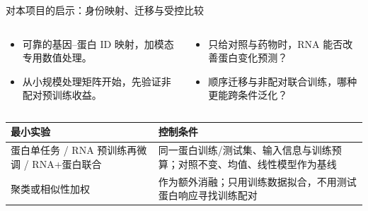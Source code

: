 \begin{frame}[t]{对本项目的启示：身份映射、迁移与受控比较}
\bodyfont
\begin{columns}[T,onlytextwidth]
\begin{column}{.47\textwidth}
\begin{itemize}\setlength\itemsep{.14cm}
\item 可靠的基因--蛋白 ID 映射，加模态专用数值处理。
\item 从小规模处理矩阵开始，先验证非配对预训练收益。
\end{itemize}
\end{column}
\begin{column}{.49\textwidth}
\begin{itemize}\setlength\itemsep{.14cm}
\item 只给对照与药物时，RNA 能否改善蛋白变化预测？
\item 顺序迁移与非配对联合训练，哪种更能跨条件泛化？
\end{itemize}
\end{column}
\end{columns}
\vspace{.10cm}
\renewcommand{\arraystretch}{1.15}
\begin{tabularx}{\textwidth}{@{}P{3.5cm}Y@{}}
\toprule\textbf{最小实验}&\textbf{控制条件}\\\midrule
蛋白单任务 / RNA 预训练再微调 / RNA+蛋白联合 & 同一蛋白训练/测试集、输入信息与训练预算；对照不变、均值、线性模型作为基线\\
聚类或相似性加权 & 作为额外消融；只用训练数据拟合，不用测试蛋白响应寻找训练配对\\\bottomrule
\end{tabularx}
\end{frame}

